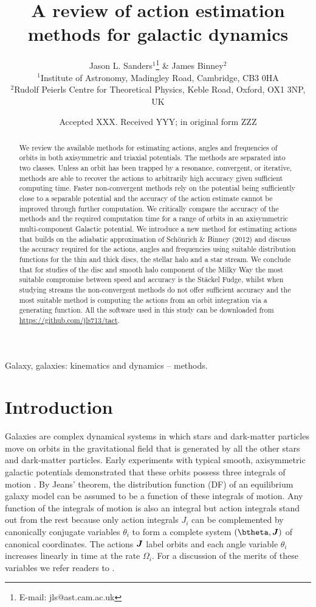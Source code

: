 \documentclass[useAMS,usenatbib,fleqn,a4paper]{mn2e}
\title{A review of action estimation methods for galactic dynamics}
\author[J. L. Sanders \& J. Binney]{Jason L. Sanders$^1$\thanks{E-mail: jls@ast.cam.ac.uk} \& James Binney$^2$\\
$^1$Institute of Astronomy, Madingley Road, Cambridge, CB3 0HA\\
$^2$Rudolf Peierls Centre for Theoretical Physics, Keble Road, Oxford, OX1 3NP, UK}
\date{Accepted XXX. Received YYY; in original form ZZZ}
\newcommand{\bs}[1]{\bmath{#1}}
\begin{document}
\label{firstpage}
\pagerange{\pageref{firstpage}--\pageref{lastpage}} 
\maketitle
\begin{abstract}
We review the available methods for estimating actions, angles and
frequencies of orbits in both axisymmetric and triaxial potentials. The
methods are separated into two classes. Unless an orbit has been trapped by a
resonance, convergent, or iterative, methods are able to recover the actions
to arbitrarily high accuracy given sufficient computing time.  Faster
non-convergent methods rely on the potential being sufficiently close to a
separable potential and the accuracy of the action estimate cannot be
improved through further computation.  We critically compare the accuracy of
the methods and the required computation time for a range of orbits in an
axisymmetric multi-component Galactic potential.  We introduce a new method
for estimating actions that builds on the adiabatic approximation of
Sch\"onrich \& Binney (2012) and discuss the accuracy required for the actions, angles and frequencies using suitable distribution functions for the
thin and thick discs, the stellar halo and a star stream. We conclude that for studies of the disc and smooth halo component of the Milky Way the most suitable compromise between speed and accuracy is the St\"ackel Fudge, whilst when studying streams the non-convergent methods do not offer sufficient accuracy and the most suitable method is computing the actions from an orbit integration via a generating function. All the software used in this study
can be downloaded from
\href{https://github.com/jls713/tact}{https://github.com/jls713/tact}.
\end{abstract}

\begin{keywords}
Galaxy, galaxies: kinematics and dynamics -- methods.
\end{keywords}

\section{Introduction}

Galaxies are complex dynamical systems in which stars and dark-matter
particles move on orbits in the gravitational field that is generated by all
the other stars and dark-matter particles. Early experiments with typical
smooth, axisymmetric galactic potentials demonstrated that these orbits
possess three integrals of motion \citep{Ollongren1962}. By Jeans' theorem,
the distribution function (DF) of an equilibrium galaxy model can be assumed to be
a function of these integrals of motion.  Any function of the integrals of
motion is also an integral but action integrals stand out from the rest
because only action integrals $J_i$ can be complemented by canonically
conjugate variables $\theta_i$ to form a complete system $(\btheta,\bs{J})$ of
canonical coordinates. The actions $\bs{J}$ label orbits and each angle
variable $\theta_i$ increases linearly in time at the rate $\Omega_i$.  For a
discussion of the merits of these variables we refer readers to
\cite{BinneyTremaine}.
\end{document}
